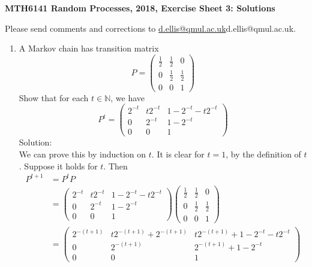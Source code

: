 \documentclass[11pt,a4paper]{report}
\begin{document}
    \textbf{MTH6141 Random Processes, 2018, Exercise Sheet 3: Solutions}\par
    Please send comments and corrections to \href{d.ellis@qmul.ac.uk}{d.ellis@qmul.ac.uk}d.ellis@qmul.ac.uk.
    \begin{enumerate}
        \item A Markov chain has transition matrix
        $$
        P
        =
        \begin{pmatrix}
            \frac{1}{2} & \frac{1}{2} & 0\\
            0 & \frac{1}{2} & \frac{1}{2}\\
            0 & 0 & 1
        \end{pmatrix}
        $$
        Show that for each $t \in \mathbb{N}$, we have
        $$
        P^t
        =
        \begin{pmatrix}
            2^{-t} & t2^{-t} & 1-2^{-t}-t2^{-t}\\
            0 & 2^{-t} & 1-2^{-t}\\
            0 & 0 & 1
        \end{pmatrix}
        $$
        Solution:\\
        We can prove this by induction on $t$. It is clear for $t = 1$, by the definition of $t$. Suppose it holds for $t$. Then
        \begin{align*}
            P^{t+1} &= P^tP\\
            &=
            \begin{pmatrix}
                2^{-t} & t2^{-t} & 1-2^{-t}-t2^{-t}\\
                0 & 2^{-t} & 1-2^{-t}\\
                0 & 0 & 1
            \end{pmatrix}
            \begin{pmatrix}
                \frac{1}{2} & \frac{1}{2} & 0\\
                0 & \frac{1}{2} & \frac{1}{2}\\
                0 & 0 & 1
            \end{pmatrix}\\
            &=
            \begin{pmatrix}
                2^{-(t+1)} & t2^{-(t+1)} + 2^{-(t+1)} & t2^{-(t+1)}+1-2^{-t}-t2^{-t}\\
                0 & 2^{-(t+1)} & 2^{-(t+1)}+1-2^{-t}\\
                0 & 0 & 1
            \end{pmatrix}\\

\end{align*}
\end{enumerate}
\end{document}
